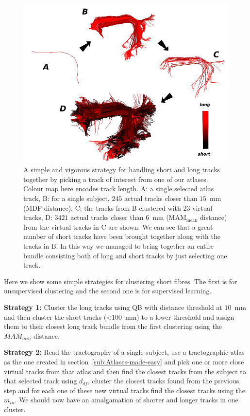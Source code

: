 \documentclass[journal]{IEEEtran}
\begin{document}
%
\begin{figure}
\begin{centering}
\includegraphics[scale=0.65]{Fig_10_arcuate_small_fibers}
\par\end{centering}
\caption{A simple and vigorous strategy for handling short and long
  tracks together by picking a track of interest from one of our
  atlases. Colour map here encodes track length. A: a single selected
  atlas track, B: for a single subject, $245$ actual tracks closer than
  $15$~mm (MDF distance), C: the tracks from B clustered with $23$
  virtual tracks, D: $3421$ actual tracks closer than $6$~mm
  ($\textrm{MAM}_{\textrm{mean}}$ distance) from the virtual tracks in C
  are shown. We can see that a great number of short tracks have been
  brought together along with the tracks in B. In this way we managed to
  bring together an entire bundle consisting both of long and short
  tracks by just selecting one track.\label{Flo:arcuate_close}}
\end{figure}

Here we show some simple strategies for clustering short fibres. The first
is for unsupervised clustering and the second one is for supervised
learning.

\textbf{Strategy 1:} Cluster the long tracks using QB with distance
threshold at $10$~mm and then cluster the short tracks (<$100$~mm) to a
lower threshold and assign them to their closest long track bundle from
the first clustering using the $MAM_{min}$ distance.

\textbf{Strategy 2:} Read the tractography of a single subject, use a
tractographic atlas as the one created in
section~\ref{sub:Atlases-made-easy} and pick one or more close virtual
tracks from that atlas and then find the closest tracks from the subject
to that selected track using $d_{df}$, cluster the closest tracks found
from the previous step and for each one of these new virtual tracks find
the closest tracks using the $m_{in}$. We should now have an
amalgamation of shorter and longer tracks in one cluster.
\end{document}

